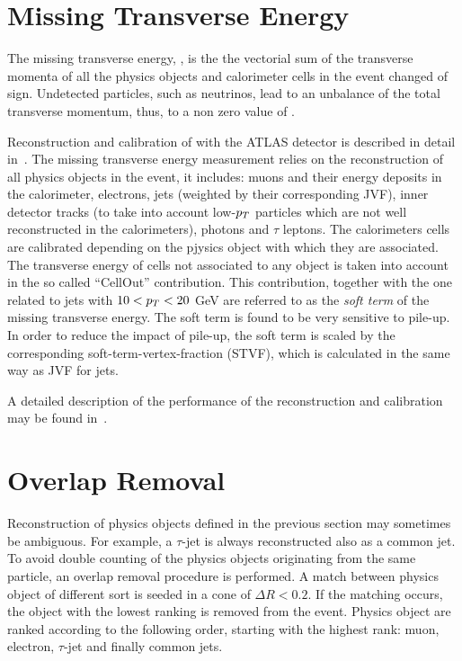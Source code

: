 \section{Missing Transverse Energy } \label{sec:met}
The missing transverse energy, \met, is the the vectorial sum of the transverse momenta
of all the physics objects and calorimeter cells in the event changed of sign. 
Undetected particles, such as neutrinos, lead to an unbalance of the total
transverse momentum, thus, to a non zero value of \met.

Reconstruction and calibration of \met with the  ATLAS detector is described in detail in~\cite{ETMISS}. 
The missing transverse energy measurement relies on the reconstruction of all physics objects 
in the event, it includes: muons and their energy deposits in the calorimeter, electrons, jets (weighted by their corresponding JVF), 
inner detector tracks (to take into account low-$p_{T}$ particles which are not well reconstructed in the calorimeters),
photons and $\tau$ leptons. The calorimeters cells are calibrated depending on the
pjysics object with which they are associated. The transverse energy of cells not associated to any object is taken into account in 
the so called ``CellOut'' contribution. This contribution,  together with the one related to jets with $10 < p_{T} < 20$ GeV
are referred to as the \emph{soft term} of the missing transverse energy.
The soft term is found to be very sensitive to pile-up. In order to reduce the impact of pile-up, the soft term
is scaled  by  the corresponding soft-term-vertex-fraction (STVF), which is calculated in the same way as JVF for jets.

A detailed description of the performance of the  \met reconstruction and calibration may be found in~\cite{ETMISS2}.


\section{Overlap Removal} \label{sec:olr}
Reconstruction of  physics objects defined in the previous section may sometimes
be ambiguous. For example, a $\tau$-jet is always reconstructed also as a common jet.
To avoid double counting of the physics objects originating from the same particle, an overlap removal procedure
is performed. A match between physics object of different sort is seeded  in a cone of $\Delta R <0.2$.
If  the matching occurs, the object with the lowest ranking is removed from the event. 
Physics object are ranked according to the following order, starting with the highest rank: muon, electron, $\tau$-jet 
and finally common jets.

